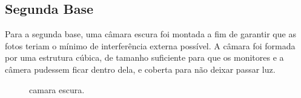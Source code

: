 \subsection{Segunda Base}

Para a segunda base, uma câmara escura foi montada a fim de garantir que as fotos teriam o mínimo de interferência externa possível. A câmara foi formada por uma estrutura cúbica, de tamanho suficiente para que os monitores e a câmera pudessem ficar dentro dela, e coberta para não deixar passar luz.

\begin{figure}
 \centering
  \hfill
  \caption{camara escura.}
  \label{camaraescura}
\end{figure}





